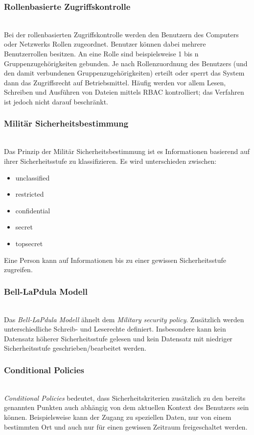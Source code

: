 \subsubsection*{Rollenbasierte Zugriffskontrolle}\hspace*{\fill} \\
Bei der rollenbasierten Zugriffskontrolle werden den Benutzern des Computers oder Netzwerks Rollen zugeordnet. Benutzer können dabei mehrere Benutzerrollen besitzen. An eine Rolle sind beispielsweise 1 bis n Gruppenzugehörigkeiten gebunden. Je nach Rollenzuordnung des Benutzers (und den damit verbundenen Gruppenzugehörigkeiten) erteilt oder sperrt das System dann das Zugriffsrecht auf Betriebsmittel. Häufig werden vor allem Lesen, Schreiben und Ausführen von Dateien mittels RBAC kontrolliert; das Verfahren ist jedoch nicht darauf beschränkt.

\subsubsection*{Militär Sicherheitsbestimmung}\hspace*{\fill} \\
Das Prinzip der Militär Sicherheitsbestimmung ist es Informationen basierend auf ihrer Sicherheitsstufe zu klassifizieren. Es wird unterschieden zwischen:
\begin{itemize}
\item unclassified
\item restricted
\item confidential
\item secret 
\item topsecret
\end{itemize}  
Eine Person kann auf Informationen bis zu einer gewissen Sicherheitsstufe zugreifen. 
\subsubsection*{Bell-LaPdula Modell}\hspace*{\fill} \\
Das \textit{Bell-LaPdula Modell} ähnelt dem \textit{Military security policy}. Zusätzlich werden unterschiedliche Schreib- und Leserechte definiert. Insbesondere kann kein Datensatz höherer Sicherheitsstufe gelesen und kein Datensatz mit niedriger Sicherheitsstufe geschrieben/bearbeitet werden.
\subsubsection*{Conditional Policies}\hspace*{\fill} \\
\textit{Conditional Policies} bedeutet, dass Sicherheitskriterien zusätzlich zu den bereits genannten Punkten auch abhängig von dem aktuellen Kontext des Benutzers sein können. Beispielsweise kann der Zugang zu speziellen Daten, nur von einem bestimmten Ort und auch nur für einen gewissen Zeitraum freigeschaltet werden.
